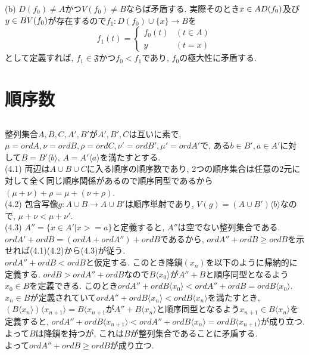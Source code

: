 \documentclass{jsarticle}
\begin{document}
(b) $D(f_0) \neq A$かつ$V(f_0) \neq B$ならば矛盾する. 実際そのとき$x \in A\\D(f_0)$及び$y \in B\\V(f_0)$が存在するので$f_1:D(f_0) \cup \{x\} \rightarrow B$を
\begin{equation*}
	f_1(t) = \begin{cases}
		f_0(t) & (t \in A)\\
		y & (t = x)
	\end{cases}
\end{equation*}
として定義すれば, $f_1 \in \mathfrak{F}$かつ$f_0 < f_1$であり, $f_0$の極大性に矛盾する.

\section{順序数} %
\subsection{} %
整列集合$A, B, C, A', B'$が$A', B', C$は互いに素で, $\mu = ord A, \nu = ord B, \rho = ord C, \nu' = ord B', \mu' = ord A'$で, ある$b \in B', a \in A'$に対して$B = B'\langle b \rangle$, $A = A'\langle a \rangle$を満たすとする.\\
(4.1) 両辺は$A \cup B \cup C$に入る順序の順序数であり, 2つの順序集合は任意の2元に対して全く同じ順序関係があるので順序同型であるから$(\mu + \nu) + \rho = \mu + (\nu + \rho)$.\\
(4.2) 包含写像$g:A \cup B \rightarrow A \cup B'$は順序単射であり, $V(g) = (A \cup B')\langle b \rangle$なので, $\mu + \nu < \mu + \nu'$.\\
(4.3) $A'' = \{x \in A' | x >= a\}$と定義すると, $A''$は空でない整列集合である. $ord A' + ord B = (ord A + ord A'') + ord B$であるから, $ord A'' + ord B \ge ord B$を示せれば(4.1)(4.2)から(4.3)が従う.\\
$ord A'' + ord B < ord B$と仮定する. このとき降鎖$(x_n)$を以下のように帰納的に定義する. $ord B > ord A'' + ord B$なので$B\langle x_0 \rangle$が$A'' + B$と順序同型となるよう$x_0 \in B$を定義できる. このとき$ord A'' + ord B\langle x_0 \rangle < ord A'' + ord B = ord B\langle x_0 \rangle$. $x_n \in B$が定義されていて$ord A'' + ord B\langle x_n \rangle < ord B\langle x_n \rangle$を満たすとき, $(B\langle x_{n} \rangle)\langle x_{n + 1} \rangle = B\langle x_{n + 1}$が$A'' + B\langle x_n \rangle$と順序同型となるよう$x_{n + 1} \in B\langle x_n \rangle$を定義すると, $ord A'' + ord B\langle x_{n + 1} \rangle < ord A'' + ord B\langle x_{n} \rangle = ord B\langle x_{n + 1}\rangle$が成り立つ. よって$B$は降鎖を持つが, これは$B$が整列集合であることに矛盾する.\\
よって$ord A'' + ord B \ge ord B$が成り立つ.
\end{document}
